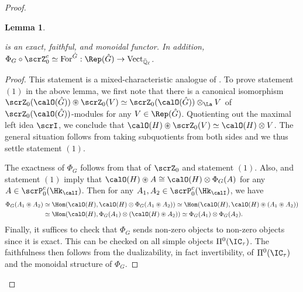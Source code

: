 \documentclass[10pt, reqno]{amsart}
\theoremstyle{plain}
\newtheorem{lemma}[theorem]{Lemma}
\theoremstyle{definition}
\numberwithin{equation}{section}
\begin{document}
\begin{proof}
\begin{lemma}
\begin{itemize}
			is an exact, faithful, and monoidal functor. In addition, $\Phi_G\circ\scrZ^c_0\simeq \mathrm{For}^{\hat{G}}:\Rep(\hat{G})\rightarrow \mathrm{Vect}_{\bar{\mathbb{Q}}_\ell} $.
		\end{itemize}
	\end{lemma}
	\begin{proof}			
		This statement is a mixed-characteristic analogue of \cite[Lemma 6.5.20]{AR}. To prove statement $(1)$ in the above lemma, we first note that there is a canonical isomorphism $\scrZ_0(\calO(\hat{G}))\circledast \scrZ_0(V)\simeq \scrZ_0(\calO(\hat{G}))\otimes_{\La}V$ of $\scrZ_0(\calO(\hat{G}))$-modules for any $V\in \Rep(\hat{G})$. Quotienting out the maximal left idea $\scrI$, we conclude that $\calO(H)\circledast \scrZ_0(V)\simeq \calO(H)\otimes V$. The general situation follows from taking subquotients from both sides and we thus settle statement $(1)$.
		
		
		The exactness of $\Phi_G$ follows from that of $\scrZ_0$ and statement $(1)$. Also,  and statement $(1)$ imply that $\calO(H)\circledast A\cong \calO(H)\otimes \Phi_G(A)$ for any $A\in\scrP_0^c(\Hk_{\calI})$. Then for any $A_1,A_2\in\scrP_0^c(\Hk_{\calI})$, we have 
		\begin{align*}
			\Phi_G(A_1\circledast A_2) & \simeq \Hom(\calO(H), \calO(H)\otimes \Phi_G(A_1\circledast A_2)) \simeq \Hom(\calO(H),\calO(H)\circledast (A_1\circledast A_2))\\
			& \simeq \Hom (\calO(H), \Phi_G(A_1)\otimes (\calO(H)\circledast A_2) )\simeq\Phi_G(A_1)\otimes \Phi_G(A_2).
		\end{align*}
		Finally, it suffices to check that $\Phi_G$ sends non-zero objects to non-zero objects since it is exact. This can be checked on all simple objects $\Pi^0(\IC_\tau)$. The faithfulness then follows from the dualizability, in fact invertibility, of $\Pi^0(\IC_\tau)$ and the monoidal structure of $\Phi_G$.
	\end{proof}
	

\end{proof}
\end{document}
